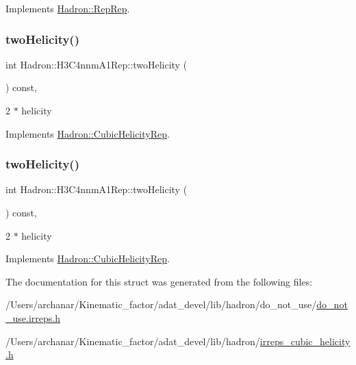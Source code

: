 Implements \mbox{\hyperlink{structHadron_1_1RepRep_ab3213025f6de249f7095892109575fde}{Hadron\+::\+Rep\+Rep}}.

\mbox{\label{structHadron_1_1H3C4nnmA1Rep_af309cb443b7986be792a59cbf09758c3}} 
\subsubsection{\texorpdfstring{twoHelicity()}{twoHelicity()}\hspace{0.1cm}{\footnotesize\ttfamily [1/2]}}
{\footnotesize\ttfamily int Hadron\+::\+H3\+C4nnm\+A1\+Rep\+::two\+Helicity (\begin{DoxyParamCaption}{ }\end{DoxyParamCaption}) const\hspace{0.3cm}{\ttfamily [inline]}, {\ttfamily [virtual]}}

2 $\ast$ helicity 

Implements \mbox{\hyperlink{structHadron_1_1CubicHelicityRep_af507aa56fc2747eacc8cb6c96db31ecc}{Hadron\+::\+Cubic\+Helicity\+Rep}}.

\mbox{\label{structHadron_1_1H3C4nnmA1Rep_af309cb443b7986be792a59cbf09758c3}} 
\subsubsection{\texorpdfstring{twoHelicity()}{twoHelicity()}\hspace{0.1cm}{\footnotesize\ttfamily [2/2]}}
{\footnotesize\ttfamily int Hadron\+::\+H3\+C4nnm\+A1\+Rep\+::two\+Helicity (\begin{DoxyParamCaption}{ }\end{DoxyParamCaption}) const\hspace{0.3cm}{\ttfamily [inline]}, {\ttfamily [virtual]}}

2 $\ast$ helicity 

Implements \mbox{\hyperlink{structHadron_1_1CubicHelicityRep_af507aa56fc2747eacc8cb6c96db31ecc}{Hadron\+::\+Cubic\+Helicity\+Rep}}.



The documentation for this struct was generated from the following files\+:\begin{DoxyCompactItemize}
\item 
/\+Users/archanar/\+Kinematic\+\_\+factor/adat\+\_\+devel/lib/hadron/do\+\_\+not\+\_\+use/\mbox{\hyperlink{do__not__use_8irreps_8h}{do\+\_\+not\+\_\+use.\+irreps.\+h}}\item 
/\+Users/archanar/\+Kinematic\+\_\+factor/adat\+\_\+devel/lib/hadron/\mbox{\hyperlink{lib_2hadron_2irreps__cubic__helicity_8h}{irreps\+\_\+cubic\+\_\+helicity.\+h}}\end{DoxyCompactItemize}
